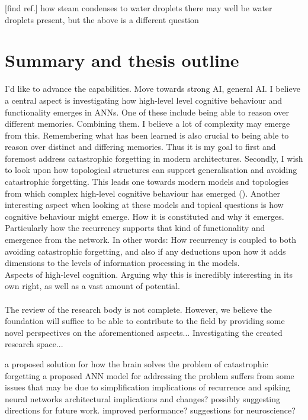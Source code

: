 [find ref.] how steam condenses to water droplets
there may well be water droplets present, but the above is a different question

\section{Summary and thesis outline}

I'd like to advance the capabilities. Move towards strong AI, general AI.
I believe a central aspect is investigating how high-level level cognitive behaviour and functionality emerges in ANNs.
One of these include being able to reason over different memories. Combining them. I believe a lot of complexity may emerge from this.
Remembering what has been learned is also crucial to being able to reason over distinct and differing memories.
Thus it is my goal to first and foremost address catastrophic forgetting in modern architectures.
Secondly, I wish to look upon how topological structures can support generalisation and avoiding catastrophic forgetting.
This leads one towards modern models and topologies from which complex high-level cognitive behaviour has emerged (\cite{Tani2014}).
Another interesting aspect when looking at these models and topical questions is how cognitive behaviour might emerge. How it is constituted and why it emerges. Particularly how the recurrency supports that kind of functionality and emergence from the network. In other words: How recurrency is coupled to both avoiding catastrophic forgetting, and also if any deductions upon how it adds dimensions to the levels of information processing in the models.
\\
Aspects of high-level cognition. Arguing why this is incredibly interesting in its own right, as well as a vast amount of potential.
\\\\
The review of the research body is not complete. However, we believe the foundation will suffice to be able to contribute to the field by providing some novel perspectives on the aforementioned aspects... Investigating the created research space...


a proposed solution for how the brain solves the problem of catastrophic forgetting
a proposed ANN model for addressing the problem
suffers from some issues that may be due to simplification
implications of recurrence and spiking neural networks
architectural implications and changes?
possibly suggesting directions for future work.
improved performance?
suggestions for neuroscience?


